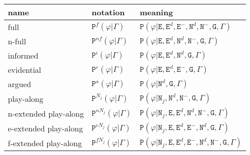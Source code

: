 \documentclass[10pt,leqno]{article}
\begin{document}
 \begin{center}
 \begin{tabular}{|p{3.2cm}|l|l|}
 \hline \hline
 \textbf{name} & \textbf{notation} & \textbf{meaning}\\ \hline 
 \footnotesize full &
  \footnotesize  $\mathtt{P}^f(\varphi \vert \Gamma)$ &
   \footnotesize $\mathtt{P}(\varphi\vert  \mathtt{E}, \mathtt{E}^d, \mathtt{E}^-,\mathtt{N}^d, \mathtt{N}^-, \mathtt{G}, \Gamma)$\\ 
   \footnotesize n-full &
     \footnotesize  $\mathtt{P}^{nf}(\varphi \vert \Gamma)$ &
      \footnotesize $\mathtt{P}(\varphi\vert  \mathtt{E}, \mathtt{E}^d,\mathtt{N}^d, \mathtt{N}^-, \mathtt{G}, \Gamma)$\\ 
 \footnotesize informed &
  \footnotesize $\mathtt{P}^i(\varphi \vert \Gamma)$ &  \footnotesize $\mathtt{P}(\varphi\vert  \mathtt{E}, \mathtt{E}^d, \mathtt{N}^d, \mathtt{G}, \Gamma)$\\ 
  \footnotesize evidential & 
   \footnotesize $\mathtt{P}^e(\varphi \vert \Gamma)$ &  \footnotesize $\mathtt{P}(\varphi\vert   \mathtt{E}, \mathtt{E}^d, \mathtt{E}^-, \mathtt{G}, \Gamma)$\\ 
 \footnotesize argued & 
  \footnotesize $\mathtt{P}^a(\varphi \vert \Gamma)$ &  \footnotesize $\mathtt{P}(\varphi\vert   \mathtt{N}^d, \mathtt{G}, \Gamma)$\\ 
   \footnotesize play-along &
    \footnotesize  $\mathtt{P}^{N_j}(\varphi \vert \Gamma)$ &  \footnotesize $\mathtt{P}(\varphi\vert  \mathtt{N}_j, \mathtt{N}^d, \mathtt{N}^-, \mathtt{G}, \Gamma)$\\ 
   \footnotesize n-extended play-along &  \footnotesize $\mathtt{P}^{nN_j}(\varphi \vert \Gamma)$ &  \footnotesize $\mathtt{P}(\varphi\vert  \mathtt{N}_j, \mathtt{E}, \mathtt{E}^d, \mathtt{N}^d, \mathtt{N}^-, \mathtt{G}, \Gamma)$\\ 
  \footnotesize e-extended play-along &  \footnotesize $\mathtt{P}^{eN_j}(\varphi \vert \Gamma)$ &  \footnotesize $\mathtt{P}(\varphi\vert  \mathtt{N}_j, \mathtt{E}, \mathtt{E}^d, \mathtt{E}^-, \mathtt{N}^d,  \mathtt{G}, \Gamma)$\\ 
    \footnotesize f-extended play-along &  \footnotesize $\mathtt{P}^{fN_j}(\varphi \vert \Gamma)$ &  \footnotesize $\mathtt{P}(\varphi\vert  \mathtt{N}_j, \mathtt{E}, \mathtt{E}^d, \mathtt{E}^-, \mathtt{N}^d,  \mathtt{N}^-, \mathtt{G}, \Gamma)$\\ 
\hline \hline
 \end{tabular}
  \end{center}
 
\end{document}
